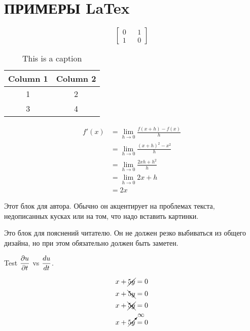 \chapter{ПРИМЕРЫ LaTex}

{\color{red}
    \[ \begin{bmatrix}
        0 && 1\\
        1 && 0
    \end{bmatrix}\]

\begin{table}[h]
    \centering
    \begin{tabular}{|c|c|} \hline 
         Column 1& Column 2\\ \hline \hline 
         1& 2\\ \hline 
         3& 4\\ \hline
    \end{tabular}
    \caption{This is a caption}
    \label{tab:my_label}
\end{table}

     \begin{align*}
         f'(x)&=\lim_{h\to 0}\frac{f(x+h)-f(x)}{h}\\
         &= \lim_{h\to 0}\frac{(x+h)^2-x^2}{h}\\
         &= \lim_{h\to 0}\frac{2xh+h^2}{h}\\
         &= \lim_{h\to 0}2x+h\\
         &=2x
     \end{align*}


}

\begin{warn}
Этот блок для автора. Обычно он акцентирует на проблемах текста, недописанных кусках или на том, что надо вставить картинки. 
\end{warn}

\begin{info}
Это блок для пояснений читателю. Он не должен резко выбиваться из общего дизайна, но при этом обязательно должен быть заметен. 
\end{info}



Test $\displaystyle\frac{\partial u}{\partial t}$ vs $\displaystyle\frac{d u}{d t}$.

\[ x+\cancel{5y}=0\]
\[ x+\bcancel{5y}=0\]
\[ x+\xcancel{5y}=0\]
\[ x+\cancelto{\infty}{5y}=0\]
